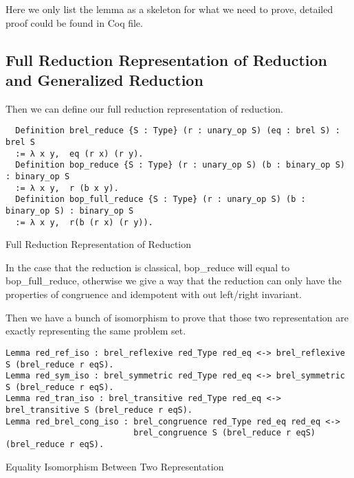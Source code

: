 Here we only list the lemma as a skeleton for what we need to prove, detailed proof could be found in Coq file.

\subsection{Full Reduction Representation of Reduction and Generalized Reduction}
Then we can define our full reduction representation of reduction.
\begin{listing}[H]
\begin{verbatim}
  Definition brel_reduce {S : Type} (r : unary_op S) (eq : brel S) : brel S
  := λ x y,  eq (r x) (r y).   
  Definition bop_reduce {S : Type} (r : unary_op S) (b : binary_op S) : binary_op S
  := λ x y,  r (b x y).
  Definition bop_full_reduce {S : Type} (r : unary_op S) (b : binary_op S) : binary_op S
  := λ x y,  r(b (r x) (r y)).   
\end{verbatim}
\caption{Full Reduction Representation of Reduction} 
\label{coq:def:full_reduction_representation}
\end{listing}
In the case that the reduction is classical, bop\_reduce will equal to bop\_full\_reduce, otherwise we give a way that the reduction can only have the properties of congruence and idempotent with out left/right invariant.

Then we have a bunch of isomorphism to prove that those two representation are exactly representing the same problem set.
\begin{listing}[H]
\begin{verbatim}
Lemma red_ref_iso : brel_reflexive red_Type red_eq <-> brel_reflexive S (brel_reduce r eqS).
Lemma red_sym_iso : brel_symmetric red_Type red_eq <-> brel_symmetric S (brel_reduce r eqS).
Lemma red_tran_iso : brel_transitive red_Type red_eq <-> brel_transitive S (brel_reduce r eqS).
Lemma red_brel_cong_iso : brel_congruence red_Type red_eq red_eq <-> 
                          brel_congruence S (brel_reduce r eqS) (brel_reduce r eqS).
\end{verbatim}
\caption{Equality Isomorphism Between Two Representation} 
\label{coq:proof:eq_iso}
\end{listing}

